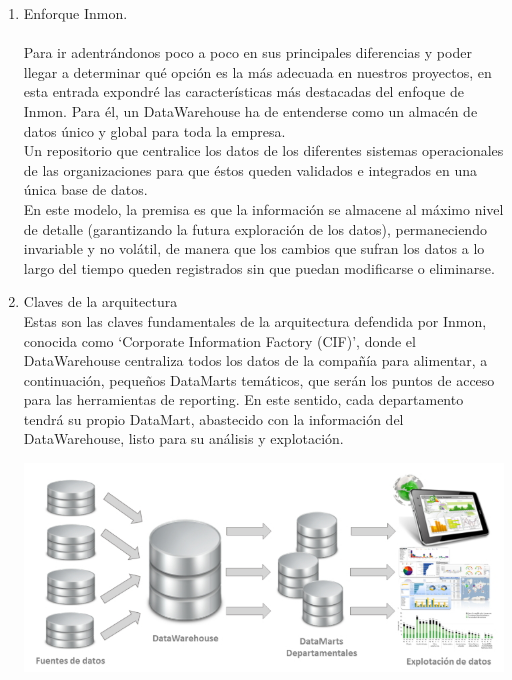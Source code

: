 \documentclass[preprint,12pt]{elsarticle}
\begin{document}
\begin{enumerate}[5.1]
    \item Enforque Inmon. \\
\\
Para ir adentrándonos poco a poco en sus principales diferencias y poder llegar a determinar qué opción es la más adecuada en nuestros proyectos, en esta entrada expondré las características más destacadas del enfoque de Inmon.
Para él, un DataWarehouse ha de entenderse como un almacén de datos único y global para toda la empresa.\\

Un repositorio que centralice los datos de los diferentes sistemas operacionales de las organizaciones para que éstos queden validados e integrados en una única base de datos.\\

En este modelo, la premisa es que la información se almacene al máximo nivel de detalle (garantizando la futura exploración de los datos), permaneciendo invariable y no volátil, de manera que los cambios que sufran los datos a lo largo del tiempo queden registrados sin que puedan modificarse o eliminarse.\\


     \item Claves de la arquitectura \\

Estas son las claves fundamentales de la arquitectura defendida por Inmon, conocida como ‘Corporate Information Factory (CIF)’, donde el DataWarehouse centraliza todos los datos de la compañía para alimentar, a continuación, pequeños DataMarts temáticos, que serán los puntos de acceso para las herramientas de reporting. En este sentido, cada departamento tendrá su propio DataMart, abastecido con la información del DataWarehouse, listo para su análisis y explotación.

\begin {center}
\includegraphics[scale= 1.8]{./Imagenes/img1.jpg}
\end {center}


\end{enumerate}
\end{document}
